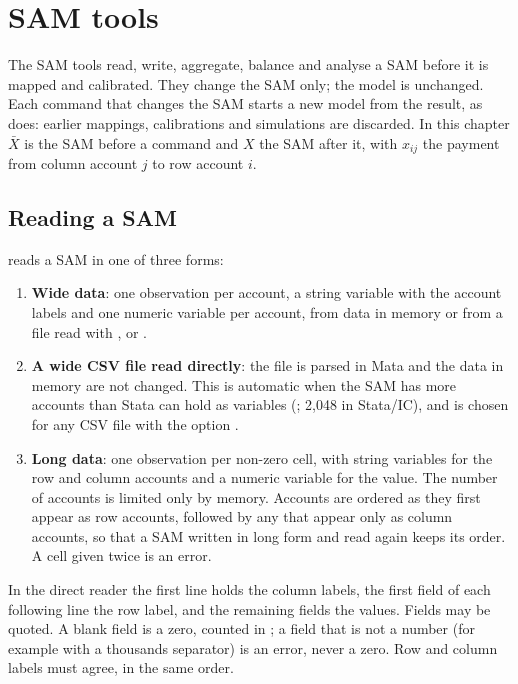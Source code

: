 \chapter{SAM tools}\label{chap:samtools}

The SAM tools read, write, aggregate, balance and analyse a SAM before it is
mapped and calibrated. They change the SAM only; the model is unchanged. Each
command that changes the SAM starts a new model from the result, as
 does: earlier mappings, calibrations and simulations are
discarded. In this chapter $\bar X$ is the SAM before a command and $X$ the SAM
after it, with $x_{ij}$ the payment from column account $j$ to row account
$i$.

\section{Reading a SAM}\label{sec:reading}

 reads a SAM in one of three forms:
\begin{enumerate}
\item \textbf{Wide data}: one observation per account, a string variable with
the account labels and one numeric variable per account, from data in memory or
from a file read with ,  or .
\item \textbf{A wide CSV file read directly}: the file is parsed in Mata and
the data in memory are not changed. This is automatic when the SAM has more
accounts than Stata can hold as variables (; 2,048 in
Stata/IC), and is chosen for any CSV file with the option .
\item \textbf{Long data}: one observation per non-zero cell, with string
variables for the row and column accounts and a numeric variable for the
value. The number of accounts is limited only by memory. Accounts are ordered
as they first appear as row accounts, followed by any that appear only as
column accounts, so that a SAM written in long form and read again keeps its
order. A cell given twice is an error.
\end{enumerate}
In the direct reader the first line holds the column labels, the first field of
each following line the row label, and the remaining fields the values. Fields
may be quoted. A blank field is a zero, counted in ; a field
that is not a number (for example  with a thousands separator) is an
error, never a zero. Row and column labels must agree, in the same order.

